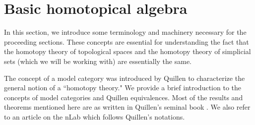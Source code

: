 \documentclass[12pt]{report}
\numberwithin{equation}{section}
\newtheorem{theorem}[dummy]{Theorem}
\begin{document}
	
	

	
	\chapter{Basic homotopical algebra}
	In this section, we introduce some terminology and machinery necessary for the proceeding sections. These concepts are essential for understanding the fact that the homotopy theory of topological spaces and the homotopy theory of simplicial sets (which we will be working with) are essentially the same.

	The concept of a model category was introduced by Quillen to characterize the general notion of a ``homotopy theory." We provide a brief introduction to the concepts of model categories and Quillen equivalences. Most of the results and theorems mentioned here are as written in Quillen's seminal book \cite{quillen1967homotopical}. We also refer to an article on the nLab \cite{nlab:introduction_to_homotopy_theory} which follows Quillen's notations.
	 
\end{document}
